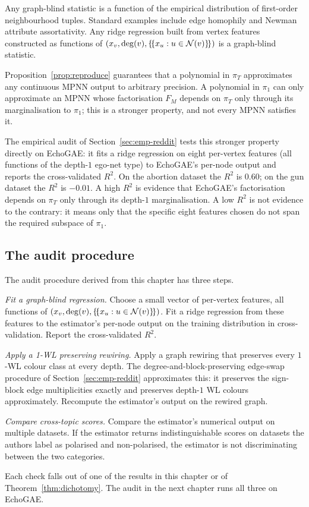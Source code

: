 Any graph-blind statistic is a function of the empirical distribution
of first-order neighbourhood tuples. Standard examples include edge
homophily and Newman attribute assortativity. Any ridge regression
built from vertex features constructed as functions of $(x_v, \deg(v),
\{\!\{x_u : u \in \mathcal{N}(v)\}\!\})$ is a graph-blind statistic.

Proposition~\ref{prop:reproduce} guarantees that a polynomial in $\pi_T$
approximates any continuous MPNN output to arbitrary precision. A
polynomial in $\pi_1$ can only approximate an MPNN whose factorisation
$F_M$ depends on $\pi_T$ only through its marginalisation to $\pi_1$;
this is a stronger property, and not every MPNN satisfies it.

The empirical audit of Section~\ref{sec:emp-reddit} tests this stronger
property directly on EchoGAE: it fits a ridge regression on eight
per-vertex features (all functions of the depth-$1$ ego-net type) to
EchoGAE's per-node output and reports the cross-validated $R^2$. On
the abortion dataset the $R^2$ is $0.60$; on the gun dataset the
$R^2$ is $-0.01$. A high $R^2$ is evidence that EchoGAE's
factorisation depends on $\pi_T$ only through its depth-$1$
marginalisation. A low $R^2$ is not evidence to the contrary: it
means only that the specific eight features chosen do not span the
required subspace of $\pi_1$.

\subsection{The audit procedure}

The audit procedure derived from this chapter has three steps.

\emph{Fit a graph-blind regression.} Choose a small vector of
per-vertex features, all functions of $(x_v, \deg(v), \{\!\{x_u : u
\in \mathcal{N}(v)\}\!\})$. Fit a ridge regression from these features to
the estimator's per-node output on the training distribution in
cross-validation. Report the cross-validated $R^2$.

\emph{Apply a 1-WL preserving rewiring.} Apply a graph rewiring that
preserves every $1$-WL colour class at every depth. The
degree-and-block-preserving edge-swap procedure of
Section~\ref{sec:emp-reddit} approximates this: it preserves the sign-block
edge multiplicities exactly and preserves depth-$1$ WL colours
approximately. Recompute the estimator's output on the rewired graph.

\emph{Compare cross-topic scores.} Compare the estimator's numerical
output on multiple datasets. If the estimator returns
indistinguishable scores on datasets the authors label as polarised
and non-polarised, the estimator is not discriminating between the
two categories.

Each check falls out of one of the results in this chapter or of
Theorem~\ref{thm:dichotomy}. The audit in the next chapter runs all three
on EchoGAE.
